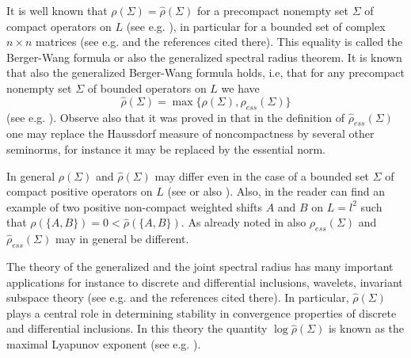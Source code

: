 \documentclass[12pt, reqno]{amsart}
\theoremstyle{definition}
\theoremstyle{remark}
\numberwithin{equation}{section}
\newcommand{\NN}{\mathbb{N}}
\begin{document}
It is well known that $\rho (\Sigma)= \hat{\rho}  (\Sigma)$ for a precompact nonempty set $\Sigma$ of compact operators on $L$ (see e.g. \cite{ShT00, ShT08, Mo}),
in particular for a bounded set of complex $n\times n$ matrices (see e.g. %
 \cite{SWP97, Dai11, MP12} and the references cited there).
This equality is called the Berger-Wang formula or also the
generalized spectral radius theorem. %
It is known that also the generalized Berger-Wang formula holds, i.e, that for any precompact nonempty  set $\Sigma$ of bounded operators on $L$ we have
$$\hat{\rho}  (\Sigma) = \max \{\rho (\Sigma), \hat{\rho} _{ess}  (\Sigma)\}$$
(see e.g.  \cite{ShT08, Mo, ShT00}). Observe also that it was proved in \cite{Mo} that in the definition of  $\hat{\rho} _{ess}  (\Sigma)$ one may replace the Haussdorf measure of noncompactness by several other seminorms, for instance it may be replaced by the essential norm.

In general $\rho (\Sigma)$ and $\hat{\rho}  (\Sigma)$ may differ even in the case of a bounded set $\Sigma$ of compact positive operators on $L$ (see \cite{SWP97} or also \cite{P17}).
Also, in \cite{Gui82} the reader can find an example of two positive non-compact weighted shifts $A$ and $B$ on $L=l^2$ such that $\rho(\{A,B\})=0 < \hat{\rho}(\{A,B\})$. As already noted in \cite{ShT00} also $\rho _{ess} (\Sigma)$ and $\hat{\rho} _{ess}  (\Sigma)$ may in general be different.

The theory of the generalized and the joint spectral radius has many important applications for instance to discrete and differential inclusions,
wavelets, invariant subspace theory
(see e.g. %
\cite{Dai11, Wi02, ShT00, ShT08} and the references cited there).
In particular, $\hat{\rho} (\Sigma)$ plays a central role in determining stability in convergence properties of discrete and differential inclusions. In this
theory the quantity $\log \hat{\rho} (\Sigma)$ is known as the maximal Lyapunov exponent (see e.g. \cite{Wi02}).
\end{document}
